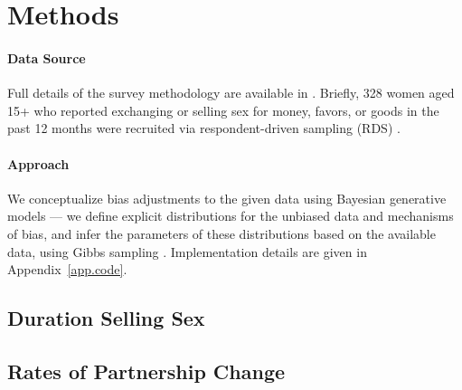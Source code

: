 \section{Methods}\label{meth}
\paragraph{Data Source}
Full details of the survey methodology are available in \cite{Yam2013}.
Briefly, 328 women aged 15+
who reported exchanging or selling sex for money, favors, or goods in the past 12 months
were recruited via respondent-driven sampling (RDS) \cite{Heckathorn1997}.
\paragraph{Approach}
We conceptualize bias adjustments to the given data using Bayesian generative models
--- \ie we define explicit distributions for the unbiased data and mechanisms of bias,
and infer the parameters of these distributions based on the available data,
using Gibbs sampling \cite{Geman1984}.
Implementation details are given in Appendix~\ref{app.code}.

\subsection{Duration Selling Sex}\label{meth.yss}


\subsection{Rates of Partnership Change}\label{meth.parts}

